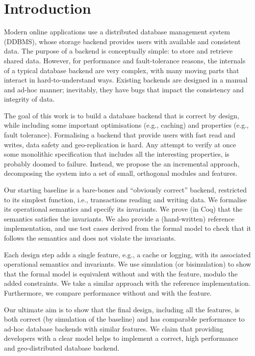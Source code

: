 \documentclass[systeme,french,english]{compas2022}
\begin{document}

\section{Introduction}

Modern online applications use a distributed database management system
(DDBMS), whose storage backend provides users with available and
consistent data.
The purpose of a backend is conceptually simple: to store and retrieve
shared data.
However, for performance and fault-tolerance reasons, the internals of a
typical database backend are very complex, with many moving parts that interact
in hard-to-understand ways.
Existing backends are designed in a manual and ad-hoc manner;
inevitably, they have bugs that impact the consistency and integrity of
data.

The goal of this work is to build a database backend that is correct by
design, while including some important optimisations (e.g., caching) and
properties (e.g., fault tolerance).
Formalising a backend that provide users with fast read and writes,
data safety and geo-replication is hard.
Any attempt to verify at once some monolithic specification that
includes all the interesting properties, is probably doomed to failure.
Instead, we propose the an incremental approach,  decomposing the
system into a set of small, orthogonal modules and features.

Our starting baseline is a bare-bones and ``obviously correct'' backend,
restricted to its simplest function, i.e., transactions reading and
writing data.
We formalise its operational semantics and specify its invariants.
We prove (in Coq) that the semantics satisfies the invariants.
We also provide a (hand-written) reference implementation, and use test
cases derived from the formal model to check that it follows the
semantics and does not violate the invariants.

Each design step adds a single feature, e.g., a cache or logging,
with its associated operational semantics and invariants.
We use simulation (or bisimulation) to show that the formal model is
equivalent without and with the feature, modulo the added constraints.
We take a similar approach with the reference implementation.
Furthermore, we compare performance without and with the feature.

Our ultimate aim is to show that the final design, including all the
features, is both correct (by simulation of the baseline) and has
comparable performance to ad-hoc database backends with similar features.
We claim that providing developers with a clear model helps to implement
a correct, high performance and geo-distributed database backend.
\end{document}
